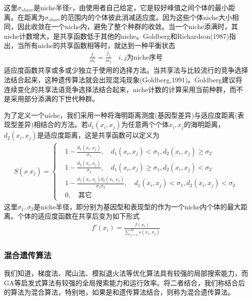             这里$\sigma_{share}$是niche半径$r$，由使用者自己给定，它是较好峰值之间个体的最小距离。在距离为$\sigma_{share}$的范围内的个体彼此消减适应度。因为这些个体niche大小相同，因此收敛在一个niche内，避免了整个种群的收敛。当一个niche添满时，其niche计数增大，是共享函数低于其他的niche。Goldberg和Richardson(1987)指出，当所有niche的共享函数相等时，就达到一种平衡状态
            \begin{align*}
            \frac{f_i}{m_i} = \frac{f_j}{m_j} \quad i,j\text{为niche序号}
            \end{align*}
            适应度函数共享或多或少独立于使用的选择方法。当共享法与比较流行的竞争选择法结合起来，这种遗传算法就会出现混沌现象(Goldberg,1991)。Goldberg建议将连续变化的共享法语竞争选择法结合起来，niche计数的计算采用当前种群，而不是采用部分添满的下世代种群。
            \par
            为了定义一个niche，我们采用一种将海明距离测度(基因型差异)与适应度距离(表现型差异)相结合的方法。若$d_1(x_i,x_j)$为任意两个个体$x_i,x_j$的海明距离，$d_2(x_i,x_j)$是适应度距离，这是共享函数可以定义为
            \begin{align*}
            S(x_,x_j) =
            \left\{
            \begin{aligned}
            & 1-\frac{d_1(x_i,x_j)}{\sigma_1},\quad d_1(x_i,x_j)<\sigma_1,d_2(x_i,x_j)\geqslant \sigma_2\\
            & 1-\frac{d_2(x_i,x_j)}{\sigma_2},\quad d_1(x_i,x_j)\geqslant\sigma_1,d_2(x_i,x_j)< \sigma_2\\
            & 1-\frac{d_1(x_i,x_j)d_2(x_i,x_j)}{\sigma_1\sigma_2},\quad d_1(x_i,x_j)<\sigma_1,d_2(x_i,x_j)< \sigma_2\\
            & 0,\quad \text{其它}
            \end{aligned}
            \right.
            \end{align*}
            这里$\sigma_1,\sigma_2$是niche半径，即分别为基因型和表现型的作为一个niche内个体的最大距离。个体的适应度函数在共享后变为如下形式
            \begin{align*}
            f'(x_i)=\frac{f(x_i)}{\sum_{j=1}^Ms(x_i,x_j)}
            \end{align*}
        \subsubsection{混合遗传算法}
            \par
            我们知道，梯度法、爬山法、模拟退火法等优化算法具有较强的局部搜索能力，而GA等启发式算法有较强的全局搜索能力和运行效率。将二者结合，我们称结合后的算法为混合算法，特别地，如果是和遗传算法结合，则称为混合遗传算法。

